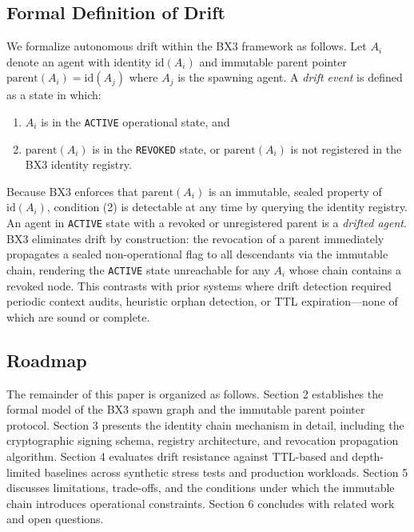 \subsection{Formal Definition of Drift}

We formalize autonomous drift within the BX3 framework as follows. Let $A_i$ denote an agent with identity $\mathrm{id}(A_i)$ and immutable parent pointer $\mathrm{parent}(A_i) = \mathrm{id}(A_j)$ where $A_j$ is the spawning agent. A \emph{drift event} is defined as a state in which:

\begin{enumerate}
    \item $A_i$ is in the \texttt{ACTIVE} operational state, and
    \item $\mathrm{parent}(A_i)$ is in the \texttt{REVOKED} state, or $\mathrm{parent}(A_i)$ is not registered in the BX3 identity registry.
\end{enumerate}

Because BX3 enforces that $\mathrm{parent}(A_i)$ is an immutable, sealed property of $\mathrm{id}(A_i)$, condition (2) is detectable at any time by querying the identity registry. An agent in \texttt{ACTIVE} state with a revoked or unregistered parent is a \emph{drifted agent}. BX3 eliminates drift by construction: the revocation of a parent immediately propagates a sealed non-operational flag to all descendants via the immutable chain, rendering the \texttt{ACTIVE} state unreachable for any $A_i$ whose chain contains a revoked node. This contrasts with prior systems where drift detection required periodic context audits, heuristic orphan detection, or TTL expiration—none of which are sound or complete.

\subsection{Roadmap}

The remainder of this paper is organized as follows. Section 2 establishes the formal model of the BX3 spawn graph and the immutable parent pointer protocol. Section 3 presents the identity chain mechanism in detail, including the cryptographic signing schema, registry architecture, and revocation propagation algorithm. Section 4 evaluates drift resistance against TTL-based and depth-limited baselines across synthetic stress tests and production workloads. Section 5 discusses limitations, trade-offs, and the conditions under which the immutable chain introduces operational constraints. Section 6 concludes with related work and open questions.